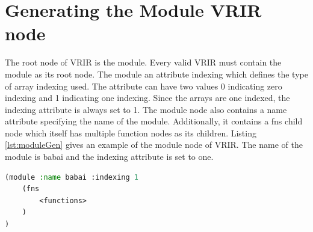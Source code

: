 \section{Generating the Module VRIR node}
The root node of VRIR is the module. Every valid VRIR must contain the module as its root node. The module an attribute indexing which defines the type of array indexing used. The attribute can have two values \textsf{0} indicating zero indexing and \textsf{1} indicating one indexing. Since the \matlab arrays are one indexed, the indexing attribute is always set to \textsf{1}. The module node also contains a name attribute specifying the name of the module. Additionally, it contains a \textsf{fns} child node which itself has multiple function nodes as its children. Listing \ref{lst:moduleGen} gives an example of the module node of VRIR. The name of the module is babai and the indexing attribute is set to one. 
\begin{lstlisting}[float,language=lisp, label={lst:moduleGen}, caption={The listing gives an example of a VRIR module that is generated by the VRIR generator.}]
(module :name babai :indexing 1
	(fns
		<functions> 
	)
)

\end{lstlisting}
